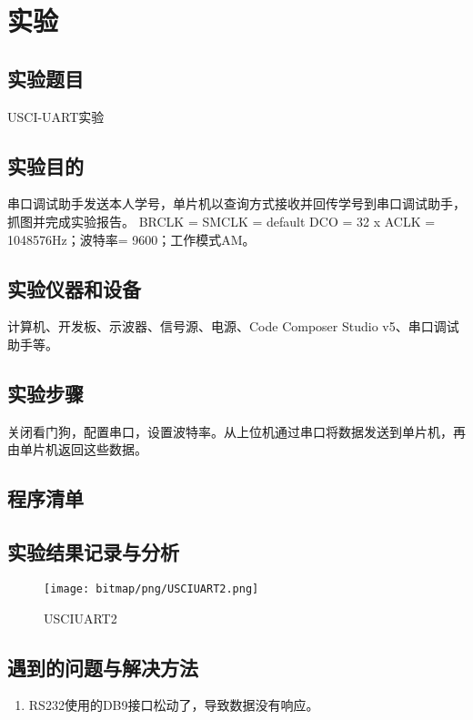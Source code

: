 ﻿%
\section{实验}
\subsection{实验题目}
USCI-UART实验
\subsection{实验目的}
串口调试助手发送本人学号，单片机以查询方式接收并回传学号到串口调试助手，抓图并完成实验报告。
BRCLK = SMCLK = default DCO = 32 x ACLK = 1048576Hz；波特率= 9600；工作模式AM。
\subsection{实验仪器和设备}
计算机、开发板、示波器、信号源、电源、Code Composer Studio v5、串口调试助手等。
\subsection{实验步骤}
关闭看门狗，配置串口，设置波特率。从上位机通过串口将数据发送到单片机，再由单片机返回这些数据。
\subsection{程序清单}

\subsection{实验结果记录与分析}
\begin{figure}[htbp]
	\centering
	\caption{USCIUART2}
	\label{USCIUART2}
	\texttt{[image: bitmap/png/USCIUART2.png]}
\end{figure}
\subsection{遇到的问题与解决方法}
\begin{enumerate}
	\item RS232使用的DB9接口松动了，导致数据没有响应。
\end{enumerate}
